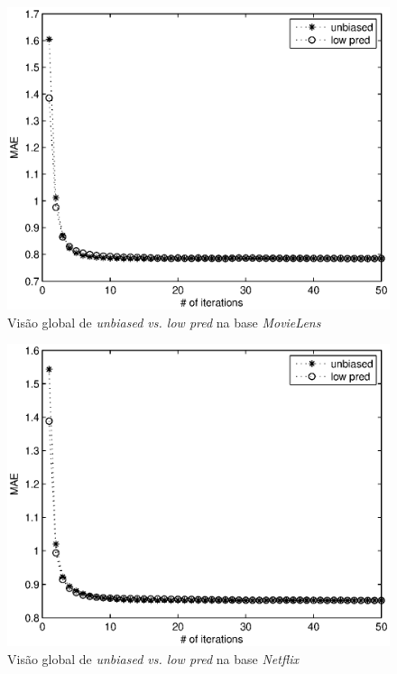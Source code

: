 \begin{figure}[ht]
\centering
\includegraphics{ml_global_low_unbiased.eps}
\caption{Visão global de \textit{unbiased vs. low pred}  na base \textit{MovieLens}}
\label{fig:unbiased-lowpred-global-movielens}
\end{figure}

\begin{figure}[ht]
\centering
\includegraphics{nf_global_low_unbiased.eps}
\caption{Visão global de \textit{unbiased vs. low pred} na base \textit{Netflix}}
\label{fig:unbiased-lowpred-global-netflix}
\end{figure}

